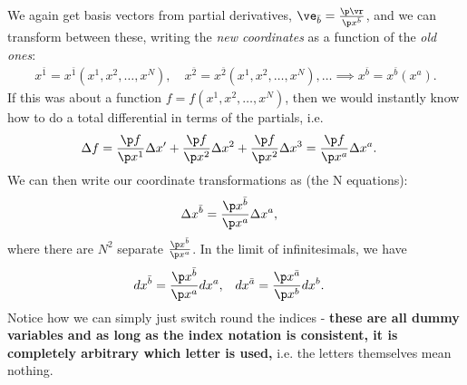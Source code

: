 \documentclass[a4paper, 11pt, normalem]{report}
\begin{document}
We again get basis vectors from partial derivatives, $\ve_{\bar{b}}=\frac{\p\vr}{\p x^{\bar{b}}}$, and we can transform between these, writing the \emph{new coordinates} as a function of the \emph{old ones}:
\begin{align}
    x^{\bar{1}}=x^{\bar{1}}(x^1,x^2,\dots,x^N),\quad x^{\bar{2}}=x^{\bar{2}}(x^1,x^2,\dots,x^N),\dots\implies x^{\bar{b}}=x^{\bar{b}}(x^a).
\end{align}
If this was about a function $f = f(x^1,x^2,\dots,x^N)$, then we would instantly know how to do a total differential in terms of the partials, i.e.
\begin{align}
    \Delta f &= \frac{\p f}{\p x^1}\Delta x' + \frac{\p f}{\p x^2}\Delta x^2 + \frac{\p f}{\p x^2}\Delta x^3 = \frac{\p f}{\p x^a}\Delta x^a.
\end{align}
We can then write our coordinate transformations as (the N equations):
\begin{align}
    \Delta x^{\bar{b}} &= \frac{\p x^{\bar{b}}}{\p x^{a}}\Delta x^{a},
\end{align}
where there are $N^2$ separate $\frac{\p x^{\bar{b}}}{\p x^a}$.
In the limit of infinitesimals, we have
\begin{align}
    dx^{\bar{b}} &= \frac{\p x^{\bar{b}}}{\p x^a}dx^a, &
    dx^{\bar{a}} &= \frac{\p x^{\bar{a}}}{\p x^b}dx^b.
\end{align}
Notice how we can simply just switch round the indices - \textbf{these are all dummy variables and as long as the index notation is consistent, it is completely arbitrary which letter is used,} i.e. the letters themselves mean nothing.
\end{document}
